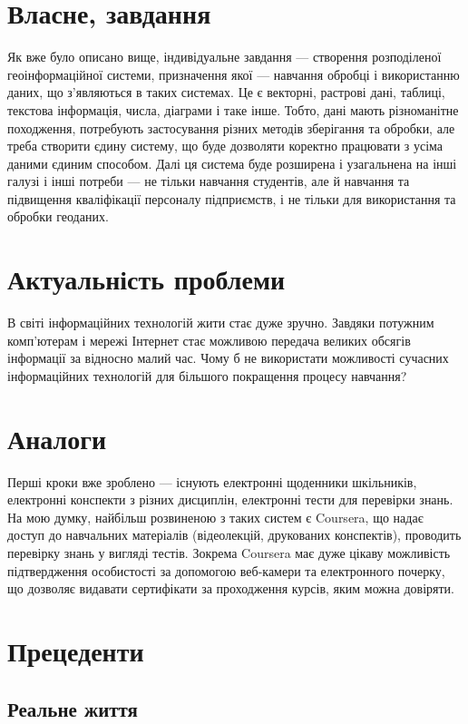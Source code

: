 \section{Власне, завдання}
Як вже було описано вище, індивідуальне завдання --- створення розподіленої
геоінформаційної системи, призначення якої --- навчання обробці і використанню
даних, що з’являються в таких системах.
Це є векторні, растрові дані, таблиці, текстова інформація, числа, діаграми
і таке інше.
Тобто, дані мають різноманітне походження, потребують застосування різних
методів зберігання та обробки, але треба створити єдину систему, що буде
дозволяти коректно працювати з усіма даними єдиним способом.
Далі ця система буде розширена і узагальнена на інші галузі і інші потреби
--- не тільки навчання студентів, але й навчання та підвищення кваліфікації
персоналу підприємств, і не тільки для використання та обробки геоданих.

\section{Актуальність проблеми}
В світі інформаційних технологій жити стає дуже зручно.
Завдяки потужним комп’ютерам і мережі Інтернет стає можливою передача великих
обсягів інформації за відносно малий час.
Чому б не використати можливості сучасних інформаційних технологій для більшого
покращення процесу навчання?

\section{Аналоги}
Перші кроки вже зроблено --- існують електронні щоденники шкільників,
електронні конспекти з різних дисциплін, електронні тести для перевірки знань.
На мою думку, найбільш розвиненою з таких систем є Coursera, що надає доступ
до навчальних матеріалів (відеолекцій, друкованих конспектів), проводить
перевірку знань у вигляді тестів. Зокрема Coursera має дуже цікаву можливість
підтвердження особистості за допомогою веб-камери та електронного почерку, що
дозволяє видавати сертифікати за проходження курсів, яким можна довіряти.

\section{Прецеденти}

\subsection{Реальне життя}

